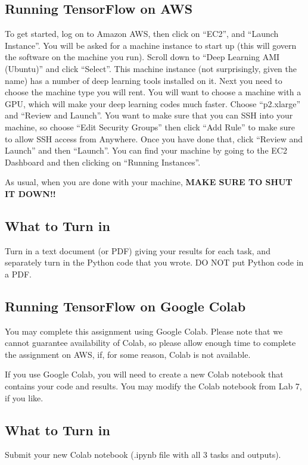 \documentclass[11pt]{article}
\renewcommand\:{\colon} %
\begin{document}
\subsection{Running TensorFlow on AWS }

To get started, log on to Amazon AWS, then click on ``EC2'', and ``Launch Instance''. You will be asked
for a machine instance to start up (this will govern the software on the machine you run). Scroll down to
``Deep Learning AMI (Ubuntu)'' and click ``Select''. This machine instance (not
surprisingly, given the name) has a number of deep learning tools installed on it. Next you need to choose
the machine type you will rent. You will want to choose a machine with a GPU, which will make your deep
learning codes much faster. Choose ``p2.xlarge'' and ``Review and Launch''. You want to make sure that you
can SSH into your machine, so choose ``Edit Security Groups'' then click ``Add Rule'' to make sure to allow
SSH access from Anywhere. Once you have done that, click ``Review and Launch'' and then ``Launch''. You can find your
machine by going to the EC2 Dashboard and then clicking on ``Running Instances''.

As usual, when you are done with your machine, \textbf{MAKE SURE TO SHUT IT DOWN!!}

\subsection{What to Turn in}
Turn in a text document (or PDF) giving your results for each task, and separately turn in the Python code that you wrote. DO NOT put Python code in a PDF.

\subsection{Running TensorFlow on Google Colab }

You may complete this assignment using Google Colab. Please note that we cannot guarantee availability of Colab, so please allow enough time to complete the assignment on AWS, if, for some reason, Colab is not available.

If you use Google Colab, you will need to create a new Colab notebook that contains your code and results. You may modify the Colab notebook from Lab 7, if you like.

\subsection{What to Turn in}
Submit  your new Colab notebook (.ipynb file with all 3 tasks and outputs). 
\end{document}

